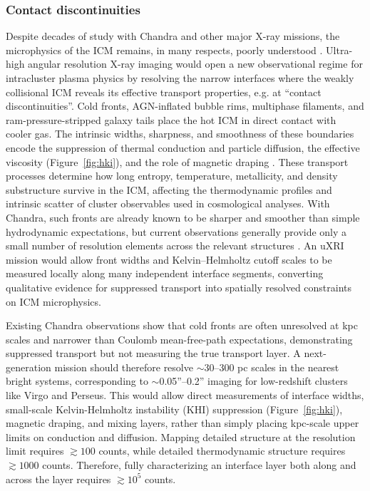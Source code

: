 \documentclass[fleqn,10pt]{SelfArx}
\begin{document}
\subsubsection{Contact discontinuities}
\label{contactdis}
Despite decades of study with Chandra and other major X-ray missions, the microphysics of the ICM remains, in many respects, poorly understood \citep{ZuHone2016}. Ultra-high angular resolution X-ray imaging would open a new observational regime for intracluster plasma physics by resolving the narrow interfaces where the weakly collisional ICM reveals its effective transport properties, e.g. at ``contact discontinuities''. Cold fronts, AGN-inflated bubble rims, multiphase filaments, and ram-pressure-stripped galaxy tails place the hot ICM in direct contact with cooler gas. The intrinsic widths, sharpness, and smoothness of these boundaries encode the suppression of thermal conduction and particle diffusion, the effective viscosity (Figure~\ref{fig:hki}), and the role of magnetic draping \citep{Vikhlinin2001,MarkevitchVikhlinin2007,2013ApJ...764...60R,WangMarkevitch2018}. 
These transport processes determine how long entropy, temperature, metallicity, and density substructure survive in the ICM, affecting the thermodynamic profiles and intrinsic scatter of cluster observables used in cosmological analyses.
With Chandra, such fronts are already known to be sharper and smoother than simple hydrodynamic expectations, but current observations generally provide only a small number of resolution elements across the relevant structures \citep{Vikhlinin2001,Werner2016,ZuHone2016}. An uXRI mission would allow front widths and Kelvin–Helmholtz cutoff scales to be measured locally along many independent interface segments, converting qualitative evidence for suppressed transport into spatially resolved constraints on ICM microphysics.

Existing Chandra observations show that cold fronts are often unresolved at kpc scales and narrower than Coulomb mean-free-path expectations, demonstrating suppressed transport but not measuring the true transport layer. A next-generation mission should therefore resolve $\sim$30–300 pc scales in the nearest bright systems, corresponding to $\sim$0.05''–0.2'' imaging for low-redshift clusters like Virgo and Perseus. This would allow direct measurements of interface widths, small-scale Kelvin-Helmholtz instability (KHI) suppression (Figure~\ref{fig:hki}), magnetic draping, and mixing layers, rather than simply placing kpc-scale upper limits on conduction and diffusion. Mapping detailed structure at the resolution limit requires $\gtrsim 100$ counts, while detailed thermodynamic structure requires $\gtrsim 1000$ counts. Therefore, fully characterizing an interface layer both along and across the layer requires $\gtrsim 10^5$ counts.
\end{document}
